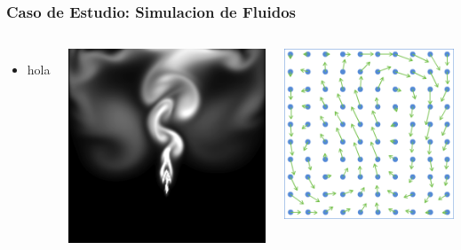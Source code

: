 \documentclass{beamer}\usetheme{Madrid} %
\begin{document}
\begin{frame}
\frametitle{Caso de Estudio: Simulacion de Fluidos}
\begin{columns}
	\begin{itemize}
		\item hola
	\end{itemize}
\begin{center}
\includegraphics[scale=0.22]{img/saved_ssnapshot.png}
\end{center}
\begin{center}
\includegraphics[scale=0.25]{img/particles_velocity.png}
\end{center}
\end{columns}
\end{frame}





\begin{frame}
\frametitle{}

\end{frame}


\end{document}
